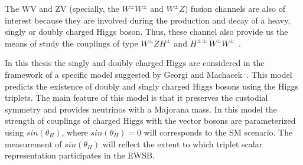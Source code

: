 The WV and ZV (specially, the $W^\pm W^\pm$ and $W^\pm Z$) fusion channels are also of interest because they are involved during the production and decay of a heavy, singly or doubly charged Higgs boson. Thus, these channel also provide us the means of study the couplings of type $W^\pm Z H^\pm$ and $H^{\pm \pm}W^\pm W^\pm$~\cite{Vega1990}. 

%
In this thesis the singly and doubly charged Higgs are considered in the framework of a specific model suggested by Georgi and Machacek~\cite{GEORGI1985463}. This model predicts the existence of doubly and singly charged Higgs bosons using the Higgs triplets. The main feature of this model is that it preserves the custodial symmetry and provides neutrinos with a Majorana mass. 
In this model the strength of couplings of charged Higgs with the vector bosons are parameterized using $sin(\theta_H)$, where $sin(\theta_H)=0$ will corresponds to the SM scenario. The measurement of $sin(\theta_H)$ will reflect the extent to which triplet scalar representation participates in the EWSB.
%
